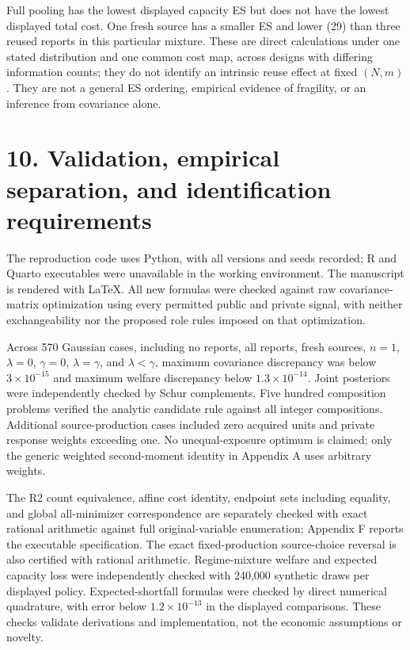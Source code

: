 \documentclass[
  11pt,
]{article}
\begin{document}
Full pooling has the lowest displayed capacity ES but does not have the
lowest displayed total cost. One fresh source has a smaller ES and lower
(29) than three reused reports in this particular mixture. These are
direct calculations under one stated distribution and one common cost
map, across designs with differing information counts; they do not
identify an intrinsic reuse effect at fixed \((N,m)\). They are not a
general ES ordering, empirical evidence of fragility, or an inference
from covariance alone.

\section{10. Validation, empirical separation, and identification
requirements}\label{validation-empirical-separation-and-identification-requirements}

The reproduction code uses Python, with all versions and seeds recorded;
R and Quarto executables were unavailable in the working environment.
The manuscript is rendered with LaTeX. All new formulas were checked
against raw covariance-matrix optimization using every permitted public
and private signal, with neither exchangeability nor the proposed role
rules imposed on that optimization.

Across 570 Gaussian cases, including no reports, all reports, fresh
sources, \(n=1\), \(\lambda=0\), \(\gamma=0\), \(\lambda=\gamma\), and
\(\lambda<\gamma\), maximum covariance discrepancy was below
\(3\times10^{-15}\) and maximum welfare discrepancy below
\(1.3\times10^{-14}\). Joint posteriors were independently checked by
Schur complements. Five hundred composition problems verified the
analytic candidate rule against all integer compositions. Additional
source-production cases included zero acquired units and private
response weights exceeding one. No unequal-exposure optimum is claimed;
only the generic weighted second-moment identity in Appendix A uses
arbitrary weights.

The R2 count equivalence, affine cost identity, endpoint sets including
equality, and global all-minimizer correspondence are separately checked
with exact rational arithmetic against full original-variable
enumeration; Appendix F reports the executable specification. The exact
fixed-production source-choice reversal is also certified with rational
arithmetic. Regime-mixture welfare and expected capacity loss were
independently checked with 240,000 synthetic draws per displayed policy.
Expected-shortfall formulas were checked by direct numerical quadrature,
with error below \(1.2\times10^{-13}\) in the displayed comparisons.
These checks validate derivations and implementation, not the economic
assumptions or novelty.
\end{document}
